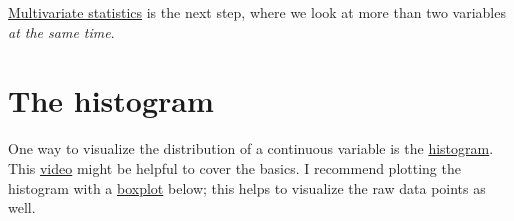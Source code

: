 \documentclass[
]{book}
\begin{document}
\href{https://en.wikipedia.org/wiki/Multivariate_statistics}{Multivariate statistics} is the next step, where we look at more than two variables \emph{at the same time}.

\section{The histogram}\label{the-histogram}

One way to visualize the distribution of a continuous variable is the \href{https://en.wikipedia.org/wiki/Histogram}{histogram}.
This \href{https://www.youtube.com/watch?v=gSEYtAjuZ-Y&ab_channel=KhanAcademy}{video} might be helpful to cover the basics.
I recommend plotting the histogram with a \href{https://en.wikipedia.org/wiki/Box_plot}{boxplot} below; this helps
to visualize the raw data points as well.
\end{document}
